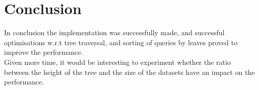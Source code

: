 \section{Conclusion}
\label{sec:con}

In conclusion the implementation was successfully made, and successful optimisations w.r.t tree traversal, and sorting of queries by leaves proved to improve the performance. 
\\[2mm]
Given more time, it would be interesting to experiment whether the ratio between the height of the tree and the size of the datasets have an impact on the performance. 


